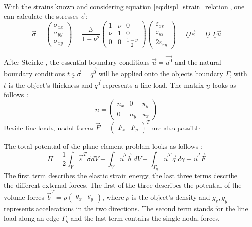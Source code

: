  With the strains known and considering equation \eqref{eq:displ_strain_relation}, one can calculate the stresses $\vec{\sigma}$:
  \begin{equation}\label{eq:sigma=D*eps}
  \vec{\sigma} = \begin{pmatrix}
  \sigma_{xx} \\
  \sigma_{yy} \\
  \sigma_{xy}
  \end{pmatrix} = \frac{E}{1-\nu^2} \begin{pmatrix}
  1 & \nu & 0 \\
  \nu & 1 & 0 \\
  0 & 0 & \frac{1-\nu}{2}
  \end{pmatrix} \begin{pmatrix}
  \varepsilon_{xx} \\
  \varepsilon_{yy} \\
  2\varepsilon_{xy}
  \end{pmatrix} = \underline{D} \vec{\varepsilon} = \underline{D}\; \underline{L} \vec{u}
  \end{equation}

  After Steinke \cite{steinke2005finite}, the essential boundary conditions $\vec{u} = \vec{u^0}$ and the natural boundary conditions $t\ \underline{n}\ \vec{\sigma} = \vec{q^0}$ will be applied onto the objects boundary $\Gamma$, with $t$ is the object's thickness and $\vec{q^0}$ represents a line load. The matrix $\underline{n}$ looks as follows \cite{steinke2005finite}:
  \begin{equation}
  \underline{n} = \begin{pmatrix}
  n_x & 0 & n_y\\ 0 & n_y & n_x
  \end{pmatrix}
  \end{equation}
  Beside line loads, nodal forces $\vec{F} = \begin{pmatrix}
  F_x & F_y
  \end{pmatrix}^T$ are also possible.
  
  The total potential of the plane element problem looks as follows \cite{steinke2005finite}:
  \begin{equation}
  \Pi = \frac{1}{2} \int_{V}\vec{\varepsilon}^T\vec{\sigma}dV - \int_{V} \vec{u}^T \vec{b}\ dV - \int_{\Gamma_q}\vec{u}^T \vec{q}\ d\gamma -\vec{u}^T \vec{F}
  \end{equation}
  The first term describes the elastic strain energy, the last three terms describe the different external forces. The first of the three describes the potential of the volume forces $\vec{b}^T = \rho \begin{pmatrix}
  g_x & g_y
  \end{pmatrix}$, where $\rho$ is the object's density and $g_x, g_y$ represents accelerations in the two directions. The second term stands for the line load along an edge $\Gamma_q$ and the last term contains the single nodal forces.
  
